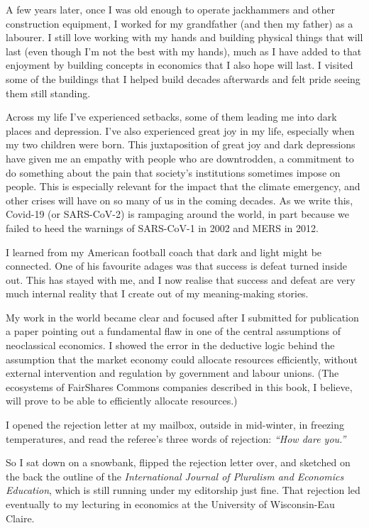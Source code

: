 A few years later, once I was old enough to operate jackhammers and other construction equipment, I worked for my grandfather (and then my father) as a labourer. I still love working with my hands and building physical things that will last (even though I'm not the best with my hands), much as I have added to that enjoyment by building concepts in economics that I also hope will last. I visited some of the buildings that I helped build decades afterwards and felt pride seeing them still standing.


Across my life I've experienced setbacks, some of them leading me into dark places and depression. I've also experienced great joy in my life, especially when my two children were born. This juxtaposition of great joy and dark depressions have given me an empathy with people who are downtrodden, a commitment to do something about the pain that society's institutions sometimes impose on people. This is especially relevant for the impact that the climate emergency, and other crises will have on so many of us in the coming decades. As we write this, Covid-19 (or SARS-CoV-2) is rampaging around the world, in part because we failed to heed the warnings of SARS-CoV-1 in 2002 and MERS in 2012.


I learned from my American football coach that dark and light might be connected. One of his favourite adages was that success is defeat turned inside out. This has stayed with me, and I now realise that success and defeat are very much internal reality that I create out of my meaning-making stories.


My work in the world became clear and focused after I submitted for publication a paper pointing out a fundamental flaw in one of the central assumptions of neoclassical economics. I showed the error in the deductive logic behind the assumption that the market economy could allocate resources efficiently, without external intervention and regulation by government and labour unions. (The ecosystems of FairShares Commons companies described in this book, I believe, will prove to be able to efficiently allocate resources.)


I opened the rejection letter at my mailbox, outside in mid-winter, in freezing temperatures, and read the referee’s three words of rejection: \emph{“How dare you.”} 


So I sat down on a snowbank, flipped the rejection letter over, and sketched on the back the outline of the \emph{International Journal of Pluralism and Economics Education}, which is still running under my editorship just fine. That rejection  led eventually to my lecturing in economics at the University of Wisconsin-Eau Claire. 


